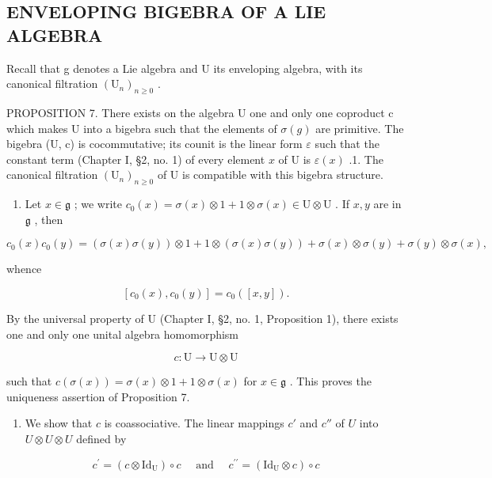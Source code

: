 \subsection{ENVELOPING BIGEBRA OF A LIE ALGEBRA}

Recall that g denotes a Lie algebra and U its enveloping algebra, with its canonical filtration \((\mathrm{U}_{n})_{n\geqslant0}\) .

PROPOSITION 7. There exists on the algebra U one and only one coproduct c which makes U into a bigebra such that the elements of \(\sigma(g)\) are primitive. The bigebra (U, c) is cocommutative; its counit is the linear form \(\varepsilon\) such that the constant term (Chapter I, §2, no. 1) of every element \(x\) of U is \(\varepsilon(x)\) .1. The canonical filtration \((\mathrm{U}_n)_{n\geqslant 0}\) of U is compatible with this bigebra structure.

\begin{enumerate}
\def\labelenumi{(\alph{enumi})}
\tightlist
\item
  Let \(x \in \mathfrak{g}\) ; we write \(c_0(x) = \sigma(x) \otimes 1 + 1 \otimes \sigma(x) \in \mathrm{U} \otimes \mathrm{U}\) . If \(x, y\) are in \(\mathfrak{g}\) , then
\end{enumerate}

\[
c _ {0} (x) c _ {0} (y) = (\sigma (x) \sigma (y)) \otimes 1 + 1 \otimes (\sigma (x) \sigma (y)) + \sigma (x) \otimes \sigma (y) + \sigma (y) \otimes \sigma (x),
\]

whence

\[
[ c _ {0} (x), c _ {0} (y) ] = c _ {0} ([ x, y ]).
\]

By the universal property of U (Chapter I, §2, no. 1, Proposition 1), there exists one and only one unital algebra homomorphism

\[
c \colon \mathrm{U} \to \mathrm{U} \otimes \mathrm{U}
\]

such that \(c(\sigma(x)) = \sigma(x) \otimes 1 + 1 \otimes \sigma(x)\) for \(x \in \mathfrak{g}\) . This proves the uniqueness assertion of Proposition 7.

\begin{enumerate}
\def\labelenumi{(\alph{enumi})}
\setcounter{enumi}{1}
\tightlist
\item
  We show that \(c\) is coassociative. The linear mappings \(c'\) and \(c''\) of \(U\) into \(U \otimes U \otimes U\) defined by
\end{enumerate}

\[
c ^ {\prime} = (c \otimes \mathrm{Id} _ {\mathrm{U}}) \circ c \quad \text { and } \quad c ^ {\prime \prime} = (\mathrm{Id} _ {\mathrm{U}} \otimes c) \circ c
\]

